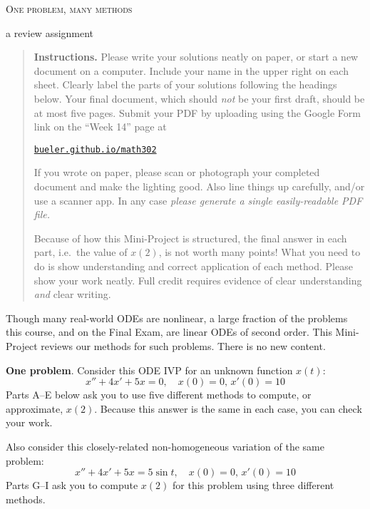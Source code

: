 \documentclass[12pt]{article}
\theoremstyle{definition}
\begin{document}
\renewcommand{\d}{\displaystyle}

\strut
\centerline{{\Large \textsc{One problem, many methods}}}

\medskip
\centerline{{\large a review assignment}}

\medskip
\small
\renewcommand{\baselinestretch}{0.95}
\begin{quote}
\textbf{Instructions.}  Please write your solutions neatly on paper, or start a new document on a computer.  Include your name in the upper right on each sheet.  Clearly label the parts of your solutions following the headings below.    Your final document, which should \emph{not} be your first draft, should be at most five pages.  Submit your PDF by uploading using the Google Form link on the ``Week 14'' page at

     \centerline{\href{https://bueler.github.io/math302/index.html}{\texttt{bueler.github.io/math302}}}  

If you wrote on paper, please scan or photograph your completed document and make the lighting good.  Also line things up carefully, and/or use a scanner app.  In any case \emph{please generate a single easily-readable PDF file.}

Because of how this Mini-Project is structured, the final answer in each part, i.e.~the value of $x(2)$, is not worth many points!  What you need to do is show understanding and correct application of each method.  Please show your work neatly.  Full credit requires evidence of clear understanding \emph{and} clear writing.
\end{quote}

\normalsize
\bigskip
\renewcommand{\baselinestretch}{1.1}

Though many real-world ODEs are nonlinear, a large fraction of the problems this course, and on the Final Exam, are linear ODEs of second order.  This Mini-Project reviews our methods for such problems.  There is no new content.

\medskip
\textbf{One problem}.  Consider this ODE IVP for an unknown function $x(t)$:
\begin{equation}
x''+4x'+5x=0, \quad x(0)=0, \, x'(0)=10 \label{homo}
\end{equation}
Parts A--E below ask you to use five different methods to compute, or approximate, $x(2)$.  Because this answer is the same in each case, you can check your work.

Also consider this closely-related non-homogeneous variation of the same problem:
\begin{equation}
x''+4x'+5x=5\sin t, \quad x(0)=0, \, x'(0)=10 \label{nonhomo}
\end{equation}
Parts G--I ask you to compute $x(2)$ for this problem using three different methods.
\end{document}
